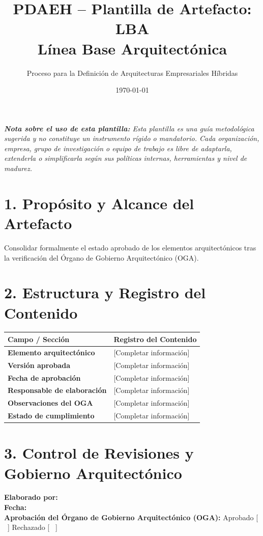 \documentclass[11pt,a4paper]{article}
\title{\textbf{\color{brandgreen} PDAEH -- Plantilla de Artefacto: LBA} \\[0.3em] \large Línea Base Arquitectónica}
\author{Proceso para la Definición de Arquitecturas Empresariales Híbridas}
\date{\today}
\begin{document}
\maketitle

\noindent \textit{\textbf{Nota sobre el uso de esta plantilla:} Esta plantilla es una guía metodológica sugerida y no constituye un instrumento rígido o mandatorio. Cada organización, empresa, grupo de investigación o equipo de trabajo es libre de adaptarla, extenderla o simplificarla según sus políticas internas, herramientas y nivel de madurez.}

\section*{1. Propósito y Alcance del Artefacto}
Consolidar formalmente el estado aprobado de los elementos arquitectónicos tras la verificación del Órgano de Gobierno Arquitectónico (OGA).

\section*{2. Estructura y Registro del Contenido}
\begin{tabularx}{\textwidth}{|>{\bfseries}p{4.5cm}|X|}
    \hline
    \rowcolor[gray]{0.92} Campo / Sección & Registro del Contenido \\ \hline
    \textbf{Elemento arquitectónico} & [Completar información] \\ \hline
    \textbf{Versión aprobada} & [Completar información] \\ \hline
    \textbf{Fecha de aprobación} & [Completar información] \\ \hline
    \textbf{Responsable de elaboración} & [Completar información] \\ \hline
    \textbf{Observaciones del OGA} & [Completar información] \\ \hline
    \textbf{Estado de cumplimiento} & [Completar información] \\ \hline
\end{tabularx}

\vspace{1.2cm}
\section*{3. Control de Revisiones y Gobierno Arquitectónico}
\noindent \textbf{Elaborado por:} \hrulefill \\[0.5em]
\textbf{Fecha:} \hrulefill \\[0.5em]
\textbf{Aprobación del Órgano de Gobierno Arquitectónico (OGA):} Aprobado [ \, ] \quad Rechazado [ \, ]
\end{document}
